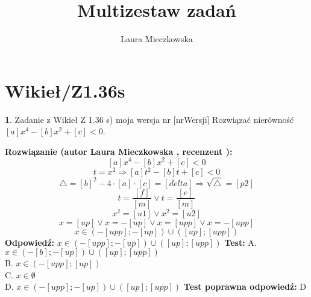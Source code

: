 \documentclass[12pt, a4paper]{article}
\title{Multizestaw zadań}
\author{Laura Mieczkowska}
\date{}
\theoremstyle{definition} %
\newtheorem{zad}{}
\newcommand{\kategoria}[1]{\section{#1}} %
\newcommand{\zadStart}[1]{\begin{zad}#1\newline} %
\newcommand{\zadStop}{\end{zad}}   %
\newcommand{\rozwStart}[2]{\noindent \textbf{Rozwiązanie (autor #1 , recenzent #2): }\newline} %
\newcommand{\odpStart}{\noindent \textbf{Odpowiedź:}\newline}    %
\newcommand{\odpStop}{\newline}                                             %
\newcommand{\testStart}{\noindent \textbf{Test:}\newline} %
\newcommand{\testStop}{\newline} %
\newcommand{\kluczStart}{\noindent \textbf{Test poprawna odpowiedź:}\newline} %
\newcommand{\kluczStop}{\newline} %
\begin{document}
\maketitle


\kategoria{Wikieł/Z1.36s}
\zadStart{Zadanie z Wikieł Z 1.36 s) moja wersja nr [nrWersji]}
Rozwiązać nierówność $[a]x^4-[b]x^2+[c]<0$.
\zadStop
\rozwStart{Laura Mieczkowska}{}
$$[a]x^4-[b]x^2+[c]<0$$
$$t=x^2 \Rightarrow [a]t^2-[b]t+[c]<0$$ 
$$\triangle=[b]^2-4\cdot[a]\cdot [c]=[delta] \Rightarrow \sqrt{\triangle}=[p2]$$
$$t=\frac{[f]}{[m]} \vee t=\frac{[e]}{[m]}$$
$$x^2=[u1] \vee x^2=[u2]$$
$$x=[up] \vee x=-[up] \vee x=[upp] \vee x=-[upp]$$
$$x\in(-[upp];-[up])\cup([up];[upp])$$
\odpStart
$x\in(-[upp];-[up])\cup([up];[upp])$
\odpStop
\testStart
A. $x\in(-[b];-[up])\cup([up];[upp])$ \\
B. $x\in(-[upp];[up])$ \\
C. $x\in\emptyset$ \\
D. $x\in(-[upp];-[up])\cup([up];[upp])$ 
\testStop
\kluczStart
D
\kluczStop
\end{document}
